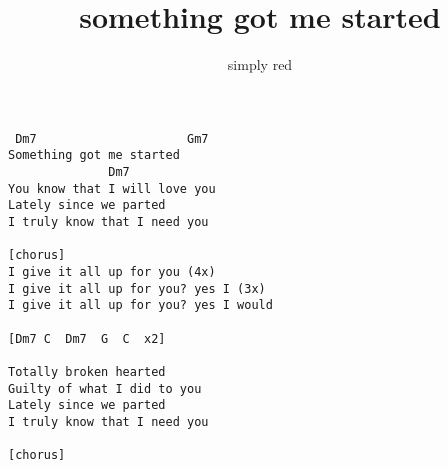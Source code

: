 \author{simply red}
\title{something got me started}
\maketitle
\begin{verbatim}
 Dm7                     Gm7
Something got me started
              Dm7
You know that I will love you
Lately since we parted
I truly know that I need you

[chorus]
I give it all up for you (4x)
I give it all up for you? yes I (3x)
I give it all up for you? yes I would

[Dm7 C  Dm7  G  C  x2]

Totally broken hearted
Guilty of what I did to you
Lately since we parted
I truly know that I need you

[chorus]
\end{verbatim}